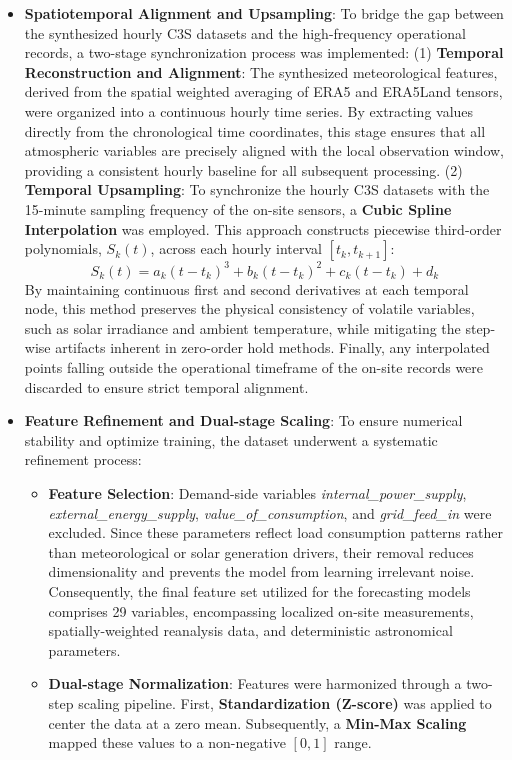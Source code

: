 \documentclass[conference]{IEEEtran}
\begin{document}
\begin{itemize}
	\item \textbf{Spatiotemporal Alignment and Upsampling}: To bridge the gap between the synthesized hourly C3S datasets and the high-frequency operational records, a two-stage synchronization process was implemented: (1) \textbf{Temporal Reconstruction and Alignment}: The synthesized meteorological features, derived from the spatial weighted averaging of ERA5 and ERA5Land tensors, were organized into a continuous hourly time series. By extracting values directly from the chronological time coordinates, this stage ensures that all atmospheric variables are precisely aligned with the local observation window, providing a consistent hourly baseline for all subsequent processing. (2) \textbf{Temporal Upsampling}: To synchronize the hourly C3S datasets with the 15-minute sampling frequency of the on-site sensors, a \textbf{Cubic Spline Interpolation} was employed. This approach constructs piecewise third-order polynomials, $S_k(t)$, across each hourly interval $[t_k, t_{k+1}]$:
	\begin{equation}
		S_k(t) = a_k(t - t_k)^3 + b_k(t - t_k)^2 + c_k(t - t_k) + d_k
	\end{equation}
	By maintaining continuous first and second derivatives at each temporal node, this method preserves the physical consistency of volatile variables, such as solar irradiance and ambient temperature, while mitigating the step-wise artifacts inherent in zero-order hold methods. Finally, any interpolated points falling outside the operational timeframe of the on-site records were discarded to ensure strict temporal alignment.
	\item \textbf{Feature Refinement and Dual-stage Scaling}: To ensure numerical stability and optimize training, the dataset underwent a systematic refinement process:
	\begin{itemize}
		\item \textbf{Feature Selection}: Demand-side variables \textit{internal\_power\_supply}, \textit{external\_energy\_supply},  \textit{value\_of\_consumption}, and \textit{grid\_feed\_in} were excluded. Since these parameters reflect load consumption patterns rather than meteorological or solar generation drivers, their removal reduces dimensionality and prevents the model from learning irrelevant noise. Consequently, the final feature set utilized for the forecasting models comprises 29 variables, encompassing localized on-site measurements, spatially-weighted reanalysis data, and deterministic astronomical parameters.
		\item \textbf{Dual-stage Normalization}: Features were harmonized through a two-step scaling pipeline. First, \textbf{Standardization (Z-score)} was applied to center the data at a zero mean. Subsequently, a \textbf{Min-Max Scaling} mapped these values to a non-negative $[0, 1]$ range.

\end{itemize}
\end{itemize}
\end{document}
